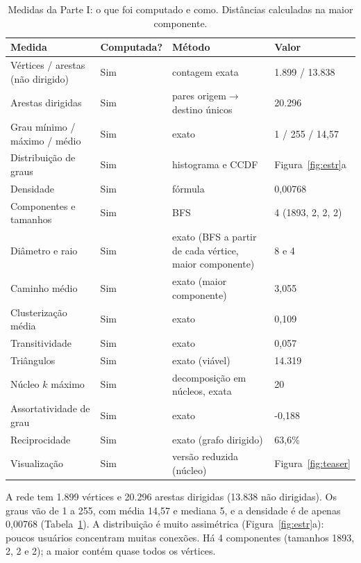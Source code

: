\documentclass[sigconf]{webmedia}
\newcommand{\nNos}{1.899}
\newcommand{\nArestasDir}{20.296}
\newcommand{\nArestasND}{13.838}
\newcommand{\grauMin}{1}
\newcommand{\grauMax}{255}
\newcommand{\grauMedio}{14{,}57}
\newcommand{\grauMediana}{5}
\newcommand{\densidade}{0{,}00768}
\newcommand{\reciprocidade}{63{,}6\%}
\newcommand{\nComponentes}{4}
\newcommand{\diametro}{8}
\newcommand{\raio}{4}
\newcommand{\caminhoMedio}{3{,}055}
\newcommand{\clustMedio}{0{,}109}
\newcommand{\transitividade}{0{,}057}
\newcommand{\nTriangulos}{14.319}
\newcommand{\coreMax}{20}
\newcommand{\assortatividade}{-0{,}188}
\begin{document}
\begin{table}[t]
  \caption{Medidas da Parte I: o que foi computado e como. Distâncias calculadas na maior componente.}
  \label{tab:medidas}
  \small
  \begin{tabular}{llll}
    \toprule
    Medida & Computada? & Método & Valor \\
    \midrule
    Vértices / arestas (não dirigido) & Sim & contagem exata & \nNos{} / \nArestasND \\
    Arestas dirigidas & Sim & pares origem$\to$destino únicos & \nArestasDir \\
    Grau mínimo / máximo / médio & Sim & exato & \grauMin{} / \grauMax{} / \grauMedio \\
    Distribuição de graus & Sim & histograma e CCDF & Figura~\ref{fig:estr}a \\
    Densidade & Sim & fórmula & \densidade \\
    Componentes e tamanhos & Sim & BFS & \nComponentes{} (1893, 2, 2, 2) \\
    Diâmetro e raio & Sim & exato (BFS a partir de cada vértice, maior componente) & \diametro{} e \raio \\
    Caminho médio & Sim & exato (maior componente) & \caminhoMedio \\
    Clusterização média & Sim & exato & \clustMedio \\
    Transitividade & Sim & exato & \transitividade \\
    Triângulos & Sim & exato (viável) & \nTriangulos \\
    Núcleo $k$ máximo & Sim & decomposição em núcleos, exata & \coreMax \\
    Assortatividade de grau & Sim & exato & \assortatividade \\
    Reciprocidade & Sim & exato (grafo dirigido) & \reciprocidade \\
    Visualização & Sim & versão reduzida (núcleo) & Figura~\ref{fig:teaser} \\
    \bottomrule
  \end{tabular}
\end{table}

A rede tem \nNos{} vértices e \nArestasDir{} arestas dirigidas (\nArestasND{} não dirigidas). Os graus vão de \grauMin{} a \grauMax{}, com média \grauMedio{} e mediana \grauMediana{}, e a densidade é de apenas \densidade{} (Tabela~\ref{tab:medidas}). A distribuição é muito assimétrica (Figura~\ref{fig:estr}a): poucos usuários concentram muitas conexões. Há \nComponentes{} componentes (tamanhos 1893, 2, 2 e 2); a maior contém quase todos os vértices.
\end{document}
